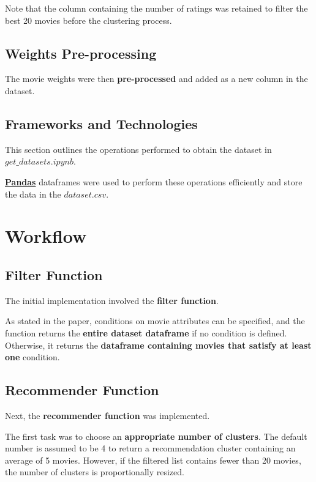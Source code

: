 \documentclass{Configuration_Files/Template}
\begin{document}
Note that the column containing the number of ratings was retained to filter the best 20 movies before the clustering process.

\subsection{Weights Pre-processing}

The movie weights were then \textbf{pre-processed} and added as a new column in the dataset.

\subsection{Frameworks and Technologies}

This section outlines the operations performed to obtain the dataset in \(get\_datasets.ipynb\).

\textbf{\href{https://pandas.pydata.org}{Pandas}} dataframes were used to perform these operations efficiently and store the data in the \(dataset.csv\).

\section{Workflow}

\subsection{Filter Function}

The initial implementation involved the \textbf{filter function}.

As stated in the paper, conditions on movie attributes can be specified, and the function returns the \textbf{entire dataset dataframe} if no condition is defined. Otherwise, it returns the \textbf{dataframe containing movies that satisfy at least one} condition.

\subsection{Recommender Function}

Next, the \textbf{recommender function} was implemented.

The first task was to choose an \textbf{appropriate number of clusters}. The default number is assumed to be 4 to return a recommendation cluster containing an average of 5 movies. However, if the filtered list contains fewer than 20 movies, the number of clusters is proportionally resized.\\
\end{document}
